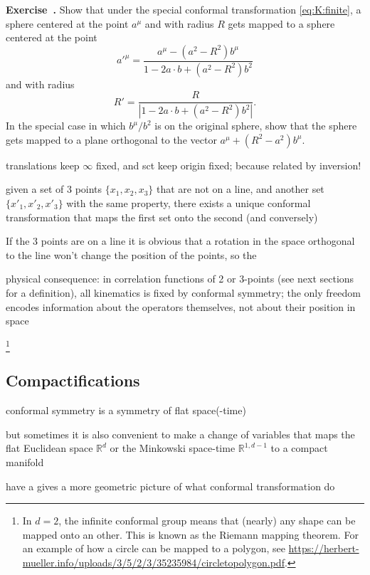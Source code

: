 \documentclass[a4paper,12pt]{article}
\numberwithin{equation}{section}
\newcounter{exercise}[section]
\newenvironment{exercise}[1][]%
	{\refstepcounter{exercise}\bigskip
	\begin{mdframed}[backgroundcolor=gray!20, linewidth=0]
	\noindent\textbf{Exercise~\thesection.\theexercise #1} \rmfamily}
  	{\end{mdframed}\bigskip}
\begin{document}
\begin{exercise}
	Show that under the special conformal transformation \eqref{eq:K:finite}, a sphere centered at the point $a^\mu$ and with radius $R$ gets mapped to a sphere centered at the point 
	$$
	a'^\mu = \frac{a^\mu - (a^2 - R^2) b^\mu}
	{1 - 2 a \cdot b + (a^2 - R^2) b^2}
	$$
	and with radius
	$$
	R' = \frac{R}{\left| 1 - 2 a \cdot b + (a^2 - R^2) b^2 \right|}.
	$$
	In the special case in which $b^\mu / b^2$ is on the original sphere, show that the sphere gets mapped to a plane orthogonal to the vector $a^\mu + (R^2 - a^2) b^\mu$.
	
\end{exercise}

translations keep $\infty$ fixed, and sct keep origin fixed; because related by inversion!


given a set of 3 points $\{ x_1, x_2, x_3 \}$ that are not on a line, and another set  $\{ x'_1, x'_2, x'_3 \}$ with the same property, there exists a unique conformal transformation that maps the first set onto the second (and conversely)

If the 3 points are on a line it is obvious that a rotation in the space orthogonal to the line won't change the position of the points, so the 


physical consequence: in correlation functions of 2 or 3-points (see next sections for a definition), all kinematics is fixed by conformal symmetry; the only freedom encodes information about the operators themselves, not about their position in space



\footnote{In $d = 2$, the infinite conformal group means that (nearly) any shape can be mapped onto an other. This is known as the Riemann mapping theorem. For an example of how a circle can be mapped to a polygon, see \url{https://herbert-mueller.info/uploads/3/5/2/3/35235984/circletopolygon.pdf}.}


\subsection{Compactifications}

conformal symmetry is a symmetry of flat space(-time)

but sometimes it is also convenient to make a change of variables that maps the flat Euclidean space $\mathds{R}^d$ or the Minkowski space-time $\mathds{R}^{1,d-1}$ to a compact manifold


 have a gives a more geometric picture of what conformal transformation do
\end{document}
